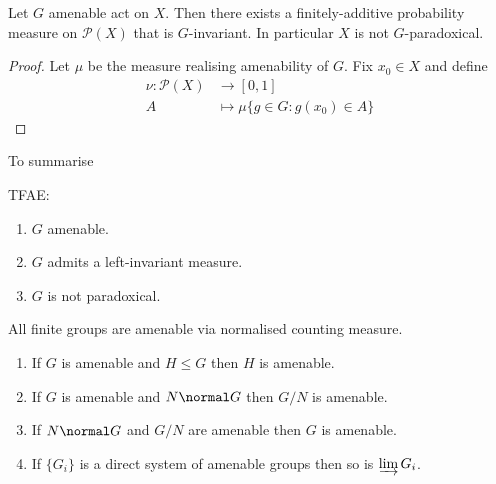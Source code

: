 \documentclass[a4paper]{article}
\begin{document}
\begin{proposition}
  Let \(G\) amenable act on \(X\). Then there exists a finitely-additive probability measure on \(\mathcal P(X)\) that is \(G\)-invariant. In particular \(X\) is not \(G\)-paradoxical.
\end{proposition}

\begin{proof}
  Let \(\mu\) be the measure realising amenability of \(G\). Fix \(x_0 \in X\) and define
  \begin{align*}
    \nu: \mathcal P(X) &\to [0, 1] \\
    A &\mapsto \mu \{g \in G: g(x_0) \in A\}
  \end{align*}
\end{proof}

To summarise

\begin{theorem}
  TFAE:
  \begin{enumerate}
  \item \(G\) amenable.
  \item \(G\) admits a left-invariant measure.
  \item \(G\) is not paradoxical.
  \end{enumerate}
\end{theorem}

\begin{eg}
  All finite groups are amenable via normalised counting measure.
\end{eg}

\begin{proposition}\leavevmode
  \label{prop:sub/quot/direct limit of amenable groups}
  \begin{enumerate}
  \item If \(G\) is amenable and \(H \leq G\) then \(H\) is amenable.
  \item If \(G\) is amenable and \(N \normal G\) then \(G/N\) is amenable.
  \item If \(N \normal G\) and \(G/N\) are amenable then \(G\) is amenable.
  \item If \(\{G_i\}\) is a direct system of amenable groups then so is \(\varinjlim G_i\).
  \end{enumerate}
\end{proposition}
\end{document}
